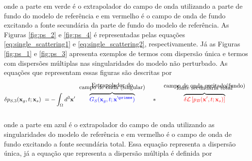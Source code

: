 onde a parte em verde é o extrapolador do campo de onda utilizando a parte de fundo do modelo de referência e em vermelho é o campo de onda de fundo excitando a fonte secundária da parte de fundo do modelo de referência. As Figuras \ref{fig:ps_2} e \ref{fig:ps_4} é representadas pelas equações \ref{eq:single_scattering1} e \ref{eq:single_scattering2}, respectivamente. Já as Figuras \ref{fig:ps_1} e \ref{fig:ps_3} apresenta exemplos de termos com dispersão única e termos com dispersões múltiplas nas singularidades do modelo não perturbado. As equações que representam essas figuras são descritas por \\

\begin{eqnarray}
\delta p_{S,3}(\mathbf{x}_{g}, t; \mathbf{x}_s) ~= - \int_{\Omega} d^3\mathbf{x}^{\prime} 
\overbrace{\color{blue}G_S(\mathbf{x}_{g}, t; \mathbf{x}^{\primme})}^{\begin{array}{c}
\text{Estrapolador do} \\[-3mm]
 \text{campo de onda (singular)}\end{array}} ~~*~~
                 \overbrace{{\color{red}\delta\mathcal{L}\left[p_B(\mathbf{x}^{\prime}, t;
                            \mathbf{x}_s)\right]}}^{\begin{array}{c}
                            \text{campo de onda excitado(fundo)} \\[-3mm]
                            \text{fonte secundária total} \end{array}}
\label{eq:single_scattering3}
\end{eqnarray}
\\

onde a parte em azul é o extrapolador do campo de onda utilizando as singularidades do modelo de referência e em vermelho é o campo de onda de fundo excitando a fonte secundária total. Essa equação representa a dispersão única, já a equação que representa a dispersão múltipla é definida por \\

